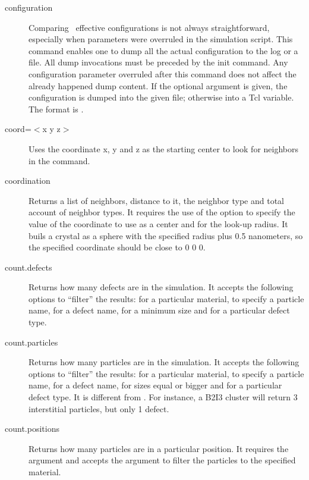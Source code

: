 \begin{description}
\item [configuration] Comparing \MMonCa\ effective configurations is not always straightforward, especially when parameters were overruled in the simulation script. This command enables one to dump all the actual configuration to the log or a file. All dump invocations must be preceded by the init command. Any configuration parameter overruled after this command does not affect the already happened dump content. If the optional argument  is given, the configuration is dumped into the given file; otherwise into a Tcl variable. The format is .

\item [coord=$<$x y z$>$] Uses the coordinate x, y and z as the starting center to look for neighbors in the  command.

\item [coordination] Returns a list of neighbors, distance to it, the neighbor type and total account of neighbor types. It requires the use of the option  to specify the value of the coordinate to use as a center and  for the look-up radius. It buils a crystal as a sphere with the specified radius plus 0.5 nanometers, so the specified coordinate should be close to 0 0 0.

\item [count.defects] Returns how many defects are in the simulation. It accepts the following options to ``filter'' the results:  for a particular material,  to specify a particle name,  for a defect name,  for a minimum size and  for a particular defect type.

\item [count.particles] Returns how many particles are in the simulation. It accepts the following options to ``filter'' the results:  for a particular material,  to specify a particle name,  for a defect name,  for sizes equal or bigger and  for a particular defect type. It is different from . For instance, a B2I3 cluster will return 3 interstitial particles, but only 1 defect.

\item [count.positions] Returns how many particles are in a particular position. It requires the argument  and accepts the argument  to filter the particles to the specified material. 


\end{description}
